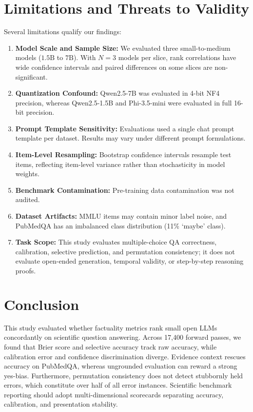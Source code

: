 \documentclass[sigconf,nonacm]{acmart}
\makeatletter
\DeclareRobustCommand{\_}{\ifmmode\nfss@text{\textunderscore}\else\textunderscore\allowbreak\fi}
\makeatother
\begin{document}
\section{Limitations and Threats to Validity}
Several limitations qualify our findings:
\begin{enumerate}
    \item \textbf{Model Scale and Sample Size:} We evaluated three small-to-medium models ($1.5\mathrm{B}$ to $7\mathrm{B}$). With $N=3$ models per slice, rank correlations have wide confidence intervals and paired differences on some slices are non-significant.
    \item \textbf{Quantization Confound:} \textsf{Qwen2.5-7B} was evaluated in 4-bit NF4 precision, whereas \textsf{Qwen2.5-1.5B} and \textsf{Phi-3.5-mini} were evaluated in full 16-bit precision.
    \item \textbf{Prompt Template Sensitivity:} Evaluations used a single chat prompt template per dataset. Results may vary under different prompt formulations.
    \item \textbf{Item-Level Resampling:} Bootstrap confidence intervals resample test items, reflecting item-level variance rather than stochasticity in model weights.
    \item \textbf{Benchmark Contamination:} Pre-training data contamination was not audited.
    \item \textbf{Dataset Artifacts:} MMLU items may contain minor label noise, and PubMedQA has an imbalanced class distribution (11\% `maybe' class).
    \item \textbf{Task Scope:} This study evaluates multiple-choice QA correctness, calibration, selective prediction, and permutation consistency; it does not evaluate open-ended generation, temporal validity, or step-by-step reasoning proofs.
\end{enumerate}

\section{Conclusion}
This study evaluated whether factuality metrics rank small open LLMs concordantly on scientific question answering. Across 17,400 forward passes, we found that Brier score and selective accuracy track raw accuracy, while calibration error and confidence discrimination diverge. Evidence context rescues accuracy on PubMedQA, whereas ungrounded evaluation can reward a strong yes-bias. Furthermore, permutation consistency does not detect stubbornly held errors, which constitute over half of all error instances. Scientific benchmark reporting should adopt multi-dimensional scorecards separating accuracy, calibration, and presentation stability.
\end{document}
